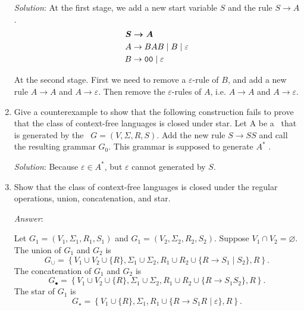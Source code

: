 \begin{enumerate}[font=\bfseries,label=2.\arabic*]
\emph{Solution}: At the first stage, we add a new start variable $S$ and the rule $S\rightarrow A$.
\begin{equation*}
\begin{split}
    \boldsymbol{S} &\boldsymbol{\rightarrow A}\\
    A &\rightarrow BAB \mid B \mid \varepsilon\\
    B &\rightarrow {\tt 00} \mid \varepsilon
\end{split}
\end{equation*}

At the second stage. First we need to remove a $\varepsilon$-rule of $B$, and add a new rule $A\rightarrow A$ and $A\rightarrow\varepsilon$. Then remove the $\varepsilon$-rules of $A$, i.e. $A\rightarrow A$ and $A\rightarrow\varepsilon$. 


\item Give a counterexample to show that the following construction fails to prove that the class of context-free languages is closed under star. Let A be a \cfl~that is generated by the \cfg~$G = (V, \Sigma, R, S)$. Add the new rule $S\rightarrow SS$ and call the resulting grammar $G_0$. This grammar is supposed to generate $A^\ast$ .

\emph{Solution}: Because $\varepsilon\in A^\ast$, but $\varepsilon$ cannot generated by $S$.


\item Show that the class of context-free languages is closed under the regular operations, union, concatenation, and star.

\emph{Answer}:

Let $G_1=(V_1,\Sigma_1,R_1,S_1)$ and $G_1=(V_2,\Sigma_2,R_2,S_2)$. Suppose $V_1\cap V_2=\varnothing$. The union of $G_1$ and $G_2$ is
$$G_\cup=\left\{V_1\cup V_2\cup\{R\},\Sigma_1\cup\Sigma_2,R_1\cup R_2\cup\{R\rightarrow S_1\mid S_2\},R\right\}.$$
The concatenation of $G_1$ and $G_2$ is
$$G_\bullet=\left\{V_1\cup V_2\cup\{R\},\Sigma_1\cup\Sigma_2,R_1\cup R_2\cup\{R\rightarrow S_1 S_2\},R\right\}.$$
The star of $G_1$ is
$$G_\star=\left\{V_1\cup \{R\},\Sigma_1,R_1\cup \{R\rightarrow S_1R\mid\varepsilon\},R\right\}.$$



\end{enumerate}
